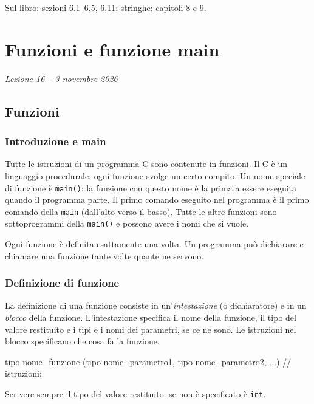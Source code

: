 \documentclass[11pt,a4paper]{article}
\begin{document}
Sul libro: sezioni 6.1--6.5, 6.11; stringhe: capitoli 8 e 9.

\section[Funzioni e funzione main (Lezione 16 -- 3 novembre 2026)]{Funzioni e funzione main}
\noindent\emph{Lezione 16 -- 3 novembre 2026}
\subsection{Funzioni}

\subsubsection{Introduzione e main}

Tutte le istruzioni di un programma C sono contenute in funzioni. Il C è un linguaggio procedurale: ogni funzione svolge un certo compito. Un nome speciale di funzione è \lstinline|main()|: la funzione con questo nome è la prima a essere eseguita quando il programma parte. Il primo comando eseguito nel programma è il primo comando della \lstinline|main| (dall'alto verso il basso). Tutte le altre funzioni sono sottoprogrammi della \lstinline|main()| e possono avere i nomi che si vuole.

Ogni funzione è definita esattamente una volta. Un programma può dichiarare e chiamare una funzione tante volte quante ne servono.

\subsubsection{Definizione di funzione}

La definizione di una funzione consiste in un'\emph{intestazione} (o dichiaratore) e in un \emph{blocco} della funzione. L'intestazione specifica il nome della funzione, il tipo del valore restituito e i tipi e i nomi dei parametri, se ce ne sono. Le istruzioni nel blocco specificano che cosa fa la funzione.
\begin{codice}
tipo nome_funzione (tipo nome_parametro1, tipo nome_parametro2, ...) {
    // istruzioni;
}
\end{codice}

\begin{osservazione}
Scrivere sempre il tipo del valore restituito: se non è specificato è \lstinline|int|.
\end{osservazione}
\end{document}
